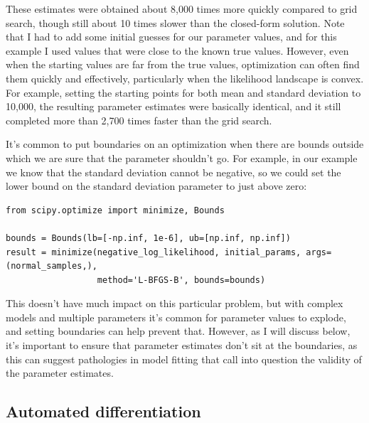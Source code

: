 These estimates were obtained about 8,000 times more quickly compared to grid search,  though still about 10 times slower than the closed-form solution.  Note that I had to add some initial guesses for our parameter values, and for this example I used values that were close to the known true values.  However, even when the starting values are far from the true values, optimization can often find them quickly and effectively, particularly when the likelihood landscape is convex. For example, setting the starting points for both mean and standard deviation to 10,000, the resulting parameter estimates were basically identical, and it still completed more than 2,700 times faster than the grid search.

It's common to put boundaries on an optimization when there are bounds outside which we are sure that the parameter shouldn't go. For example, in our example we know that the standard deviation cannot be negative, so we could set the lower bound on the standard deviation parameter to just above zero:

\begin{lstlisting}[style=Python]
from scipy.optimize import minimize, Bounds

bounds = Bounds(lb=[-np.inf, 1e-6], ub=[np.inf, np.inf])
result = minimize(negative_log_likelihood, initial_params, args=(normal_samples,), 
                  method='L-BFGS-B', bounds=bounds)
\end{lstlisting}

This doesn't have much impact on this particular problem, but with complex models and multiple parameters it's common for parameter values to explode, and setting boundaries can help prevent that. However, as I will discuss below, it's important to ensure that parameter estimates don't sit at the boundaries, as this can suggest pathologies in model fitting that call into question the validity of the parameter estimates.

\subsection{Automated differentiation}

